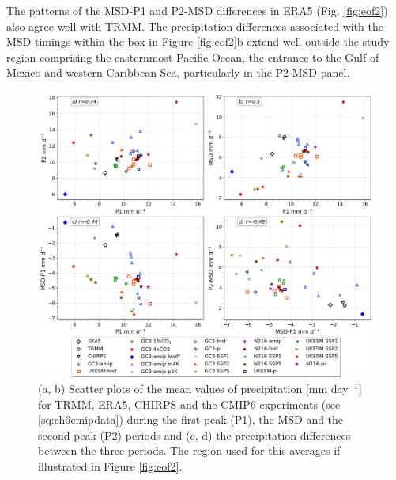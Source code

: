  
  The patterns of the MSD-P1 and P2-MSD differences in ERA5 (Fig. \ref{fig:eof2}) also agree well with TRMM. The precipitation differences associated with the MSD timings within the box in Figure \ref{fig:eof2}b extend well outside the study region comprising the easternmost Pacific Ocean, the entrance to the Gulf of Mexico and western Caribbean Sea, particularly in the P2-MSD panel.%
 


 \begin{figure}[b!]
\includegraphics[width=\linewidth]{figures/dumscatter_2.png}
\caption[Scatter plot of mean precipitation in different parts of seasonal cycle]{(a, b) Scatter plots of the mean values of precipitation [mm day$^{-1}$] for TRMM, ERA5, CHIRPS and the CMIP6 experiments (see \ref{sq:ch6cmipdata}) during the first peak (P1), the MSD and the second peak (P2) periods and (c, d) the precipitation differences between the three periods. The region used for this averages if illustrated in Figure \ref{fig:eof2}.  
  }
\label{fig:scatter_msd}
\end{figure}  
 
